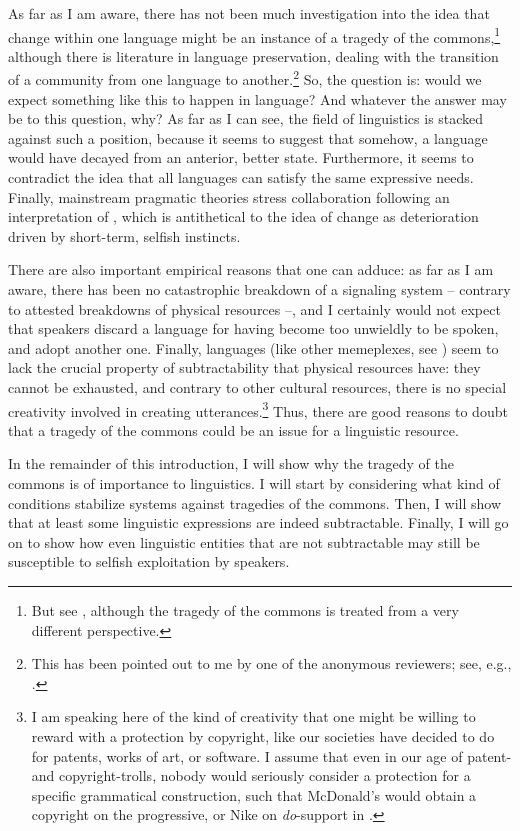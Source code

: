 \documentclass[output=paper,hidelinks]{langscibook}
\begin{document}
As far as I am aware, there has not been much investigation into the idea that change within one language might be an instance of a tragedy of the commons,\footnote{But see \citet{nikitina18}, although the tragedy of the commons is treated from a very different perspective.} although there is literature in language preservation, dealing with the transition of a community from one language to another.\footnote{This has been pointed out to me by one of the anonymous reviewers; see, e.g., \citet{beckerman96,eggington10}.}  So, the question is: would we expect something like this to happen in language? And whatever the answer may be to this question, why?
As far as I can see, the field of linguistics is stacked against such a position, because it seems to suggest that somehow, a language would have decayed from an anterior, better state. Furthermore, it seems to contradict the idea that all languages can satisfy the same expressive needs. Finally, mainstream pragmatic theories \citep[witness, e.g.][]{clark96} stress collaboration following an interpretation of \citet{grice75}, which is antithetical to the idea of change as deterioration driven by short-term, selfish instincts.

There are also important empirical reasons that one can adduce: as far as I am aware, there has been no catastrophic breakdown of a signaling system -- contrary to attested breakdowns of physical resources --, and I certainly would not expect that speakers discard a language for having become too unwieldly to be spoken, and adopt another one. Finally, languages (like other memeplexes, see \citealt{blackmore99}) seem to lack the crucial property of subtractability that physical resources have: they cannot be exhausted, and contrary to other cultural resources, there is no special creativity involved in creating utterances.\footnote{I am speaking here of the kind of creativity that one might be willing to reward with a protection by copyright, like our societies have decided to do for patents, works of art, or software. I assume that even in our age of patent- and copyright-trolls, nobody would seriously consider a protection for a specific grammatical construction, such that McDonald's would obtain a copyright on the progressive, or Nike on \emph{do}-support in .} Thus, there are good reasons to doubt that a tragedy of the commons could be an issue for a linguistic resource. 

In the remainder of this introduction, I will show why the tragedy of the commons is of importance to linguistics. I will start by considering what kind of conditions stabilize systems against tragedies of the commons. Then, I will show that at least some linguistic expressions are indeed subtractable. Finally, I will go on to show how even linguistic entities that are not subtractable may still be susceptible to selfish exploitation by speakers.
\end{document}
